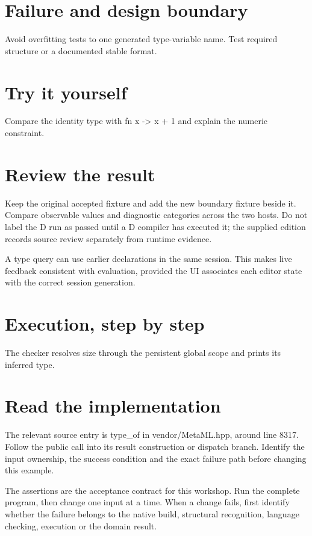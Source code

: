 
\section*{Failure and design boundary}
Avoid overfitting tests to one generated type-variable name. Test required structure or a documented stable format.

\section*{Try it yourself}
Compare the identity type with fn x -> x + 1 and explain the numeric constraint.

\section*{Review the result}
Keep the original accepted fixture and add the new boundary fixture beside it. Compare observable values and diagnostic categories across the two hosts. Do not label the D run as passed until a D compiler has executed it; the supplied edition records source review separately from runtime evidence.

\clearpage
{}
A type query can use earlier declarations in the same session. This makes live feedback consistent with evaluation, provided the UI associates each editor state with the correct session generation.


\section*{Execution, step by step}
The checker resolves size through the persistent global scope and prints its inferred type.

\section*{Read the implementation}
The relevant source entry is type\_of in vendor/MetaML.hpp, around line 8317. Follow the public call into its result construction or dispatch branch. Identify the input ownership, the success condition and the exact failure path before changing this example.

The assertions are the acceptance contract for this workshop. Run the complete program, then change one input at a time. When a change fails, first identify whether the failure belongs to the native build, structural recognition, language checking, execution or the domain result.

